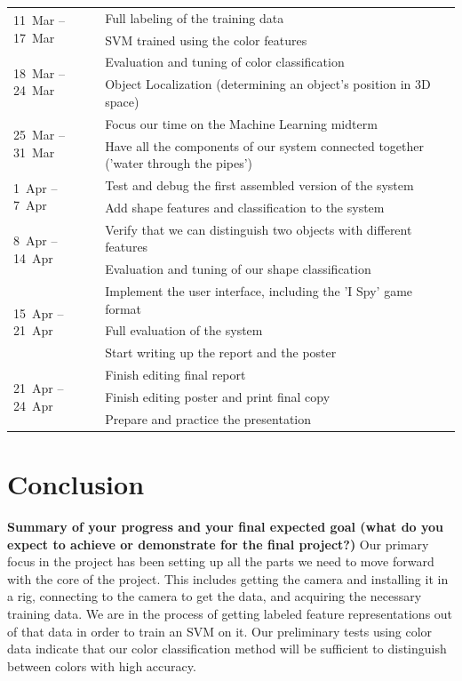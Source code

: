 \documentclass[11pt]{article}
\newcommand{\xxx}[1]{{\bf \color{red} #1}}
\newcommand\T{\rule{0pt}{3ex}}
\newcommand\B{\rule[-1.2ex]{0pt}{0pt}}
\begin{document}
\begin{center}
    \begin{tabular}{ | l | l |}
    \hline
    \multirow{2}{*}{11~Mar -- 17~Mar}
	& Full labeling of the training data \T \\
	& SVM trained using the color features \B \\
    \hline
    \multirow{2}{*}{18~Mar -- 24~Mar}
	& Evaluation and tuning of color classification \T \\
	& Object Localization (determining an object's position in 3D space) \B \\
    \hline
    \multirow{2}{*}{25~Mar -- 31~Mar}
	& Focus our time on the Machine Learning midterm \T\\
	& Have all the components of our system connected together ('water through the pipes') \B \\
    \hline
    \multirow{2}{*}{1~Apr -- 7~Apr}
	& Test and debug the first assembled version of the system \T \\
	& Add shape features and classification to the system \B\\
    \hline
    \multirow{2}{*}{8~Apr -- 14~Apr}
	& Verify that we can distinguish two objects with different features \T\\
	& Evaluation and tuning of our shape classification \B \\
    \hline
    \multirow{3}{*}{15~Apr -- 21~Apr}
	& Implement the user interface, including the 'I Spy' game format \T\\
	& Full evaluation of the system \\
	& Start writing up the report and the poster \B \\
    \hline
    \multirow{3}{*}{21~Apr -- 24~Apr}
	& Finish editing final report \T \\
	& Finish editing poster and print final copy \\
	& Prepare and practice the presentation \B \\
    \hline
    \end{tabular}
\end{center}

\section{Conclusion}
\xxx{Summary of your progress and your final expected goal (what do you expect
    to achieve or demonstrate for the final project?)}
Our primary focus in the project has been setting up all the parts we need to move forward with the core of the project. This includes getting the camera and installing it in a rig, connecting to the camera to get the data, and acquiring the necessary training data. We are in the process of getting labeled feature representations out of that data in order to train an SVM on it. Our preliminary tests using color data indicate that our color classification method will be sufficient to distinguish between colors with high accuracy.
\end{document}
